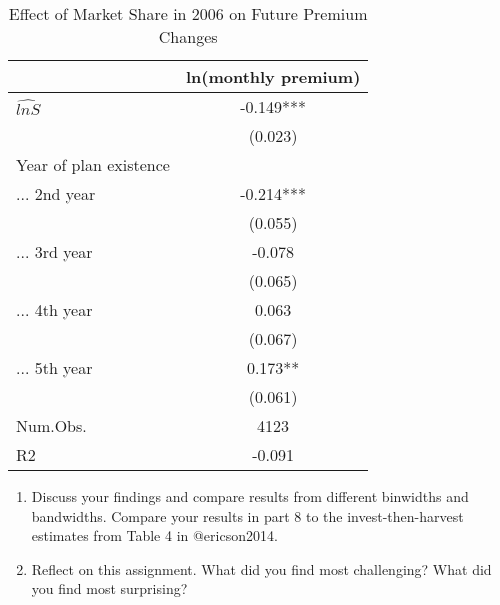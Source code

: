 \documentclass[
  12pt,
]{article}
\begin{document}
\begin{table}
\caption{Effect of Market Share in 2006 on Future Premium Changes}
\centering
\begin{tabular}[t]{lc}
\midrule
\addlinespace[0.3em]
  & ln(monthly premium)\\
\midrule
$\hat{lnS}$ & -0.149***\\
  & (0.023)\\
\multicolumn{1}{l}{Year of plan existence}\\
\hspace{1em} ... 2nd year & -0.214***\\
 & (0.055)\\
\hspace{1em} ... 3rd year & -0.078\\
 & (0.065)\\
\hspace{1em} ... 4th year & 0.063\\
 & (0.067)\\
\hspace{1em} ... 5th year & 0.173**\\
 & (0.061)\\
Num.Obs. & 4123\\
R2 & -0.091\\
\bottomrule
\end{tabular}
\end{table}

\begin{enumerate}
\def\labelenumi{\arabic{enumi}.}
\setcounter{enumi}{8}
\item
  Discuss your findings and compare results from different binwidths and
  bandwidths. Compare your results in part 8 to the invest-then-harvest
  estimates from Table 4 in @ericson2014.
\item
  Reflect on this assignment. What did you find most challenging? What
  did you find most surprising?
\end{enumerate}
\end{document}
